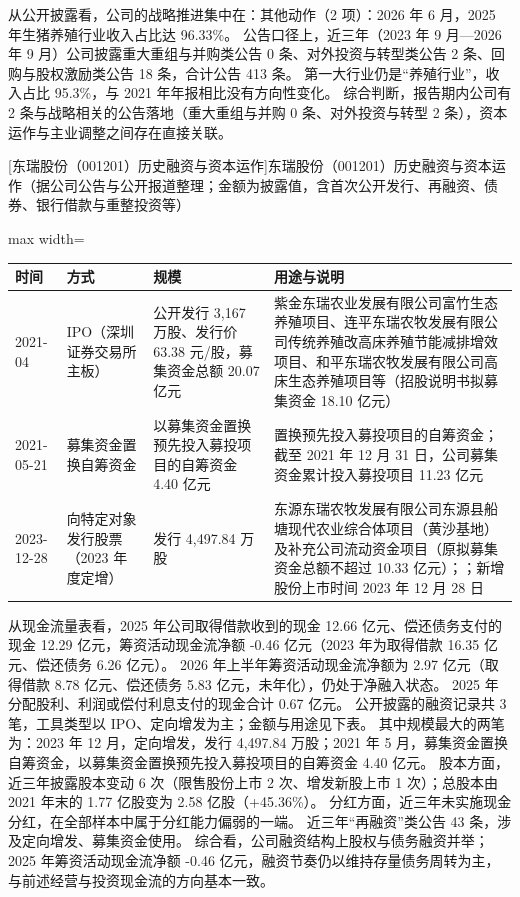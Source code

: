  从公开披露看，公司的战略推进集中在：其他动作（2 项）：2026 年 6 月，2025 年生猪养殖行业收入占比达 96.33\%。 公告口径上，近三年（2023 年 9 月---2026 年 9 月）公司披露重大重组与并购类公告 0 条、对外投资与转型类公告 2 条、回购与股权激励类公告 18 条，合计公告 413 条。 第一大行业仍是“养殖行业”，收入占比 95.3\%，与 2021 年年报相比没有方向性变化。 综合判断，报告期内公司有 2 条与战略相关的公告落地（重大重组与并购 0 条、对外投资与转型 2 条），资本运作与主业调整之间存在直接关联。

\begin{center}\small\setlength{\tabcolsep}{4pt}
[东瑞股份（001201）历史融资与资本运作]{东瑞股份（001201）历史融资与资本运作（据公司公告与公开报道整理；金额为披露值，含首次公开发行、再融资、债券、银行借款与重整投资等）}
\begin{adjustbox}{max width=\textwidth}
\begin{tabular}{@{}p{1.45cm}p{2.55cm}p{4.05cm}p{4.95cm}@{}}
\toprule
时间 & 方式 & 规模 & 用途与说明 \\
\midrule
2021-04 & IPO（深圳证券交易所主板） & 公开发行 3,\allowbreak{}167 万股、\allowbreak{}发行价 63.38 元/\allowbreak{}股，\allowbreak{}募集资金总额 20.07 亿元 & 紫金东瑞农业发展有限公司富竹生态养殖项目、\allowbreak{}连平东瑞农牧发展有限公司传统养殖改高床养殖节能减排增效项目、\allowbreak{}和平东瑞农牧发展有限公司高床生态养殖项目等（招股说明书拟募集资金 18.10 亿元） \\
2021-05-21 & 募集资金置换自筹资金 & 以募集资金置换预先投入募投项目的自筹资金 4.40 亿元 & 置换预先投入募投项目的自筹资金；截至 2021 年 12 月 31 日，\allowbreak{}公司募集资金累计投入募投项目 11.23 亿元 \\
2023-12-28 & 向特定对象发行股票（2023 年度定增） & 发行 4,\allowbreak{}497.84 万股 & 东源东瑞农牧发展有限公司东源县船塘现代农业综合体项目（黄沙基地）及补充公司流动资金项目（原拟募集资金总额不超过 10.33 亿元）；；新增股份上市时间 2023 年 12 月 28 日 \\
\bottomrule
\end{tabular}
\end{adjustbox}
\end{center}

 从现金流量表看，2025 年公司取得借款收到的现金 12.66 亿元、偿还债务支付的现金 12.29 亿元，筹资活动现金流净额 -0.46 亿元（2023 年为取得借款 16.35 亿元、偿还债务 6.26 亿元）。 2026 年上半年筹资活动现金流净额为 2.97 亿元（取得借款 8.78 亿元、偿还债务 5.83 亿元，未年化），仍处于净融入状态。 2025 年分配股利、利润或偿付利息支付的现金合计 0.67 亿元。 公开披露的融资记录共 3 笔，工具类型以 IPO、定向增发为主；金额与用途见下表。 其中规模最大的两笔为：2023 年 12 月，定向增发，发行 4,497.84 万股；2021 年 5 月，募集资金置换自筹资金，以募集资金置换预先投入募投项目的自筹资金 4.40 亿元。 股本方面，近三年披露股本变动 6 次（限售股份上市 2 次、增发新股上市 1 次）；总股本由 2021 年末的 1.77 亿股变为 2.58 亿股（+45.36\%）。 分红方面，近三年未实施现金分红，在全部样本中属于分红能力偏弱的一端。 近三年“再融资”类公告 43 条，涉及定向增发、募集资金使用。 综合看，公司融资结构上股权与债务融资并举；2025 年筹资活动现金流净额 -0.46 亿元，融资节奏仍以维持存量债务周转为主，与前述经营与投资现金流的方向基本一致。

